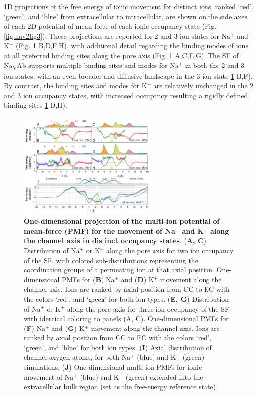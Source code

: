 \begin{refsection}
1D projections of the free energy of ionic movement for distinct ions, ranked `red', `green', and `blue' from extracellular to intracellular, are shown on the side axes of each 2D potential of mean force of each ionic occupancy state (Fig. \ref{fig:nav2fig3}). These projections are reported for 2 and 3 ion states for Na$^+$ and K$^+$ (Fig. \ref{fig:nav2fig3-5} B,D,F,H), with additional detail regarding the binding modes of ions at all preferred binding sites along the pore axis (Fig. \ref{fig:nav2fig3-5} A,C,E,G). The SF of Na\textsubscript{V}Ab supports multiple binding sites and modes for Na$^+$ in both the 2 and 3 ion states, with an even broader and diffusive landscape in the 3 ion state \ref{fig:nav2fig3-5} B,F). By contrast, the binding sites and modes for K$^+$ are relatively unchanged in the 2 and 3 ion occupancy states, with increased occupancy resulting a rigidly defined binding sites \ref{fig:nav2fig3-5} D,H).  

\begin{figure}[!htb]
\centering
\includegraphics[width=0.6\textwidth]{nav2/Nav2Fig3-5}
\caption[One-dimensional projection of the multi-ion potential of mean-force (PMF) for the movement of Na$^+$ and K$^+$ along the channel axis in distinct occupancy states]{\textbf{One-dimensional projection of the multi-ion potential of mean-force (PMF) for the movement of Na$^+$ and K$^+$ along the channel axis in distinct occupancy states}. (\textbf{A, C}) Distribution of Na$^+$ or K$^+$ along the pore axis for two ion occupancy of the SF, with colored sub-distributions representing the coordination groups of a permeating ion at that axial position. One-dimensional PMFs for (\textbf{B}) Na$^+$ and (\textbf{D}) K$^+$ movement along the channel axis. Ions are ranked by axial position from CC to EC with the colors `red', and `green' for both ion types. (\textbf{E, G}) Distribution of Na$^+$ or K$^+$ along the pore axis for three ion occupancy of the SF with identical coloring to panels (A, C). One-dimensional PMFs for (\textbf{F}) Na$^+$ and (\textbf{G}) K$^+$ movement along the channel axis. Ions are ranked by axial position from CC to EC with the colors `red', `green', and `blue' for both ion types. (\textbf{I}) Axial distribution of channel oxygen atoms, for both Na$^+$ (blue) and K$^+$ (green) simulations. (\textbf{J}) One-dimensional multi-ion PMFs for ionic movement of Na$^+$ (blue) and K$^+$ (green) extended into the extracellular bulk region (set as the free-energy reference state).}
\label{fig:nav2fig3-5}
\end{figure}


\end{refsection}
